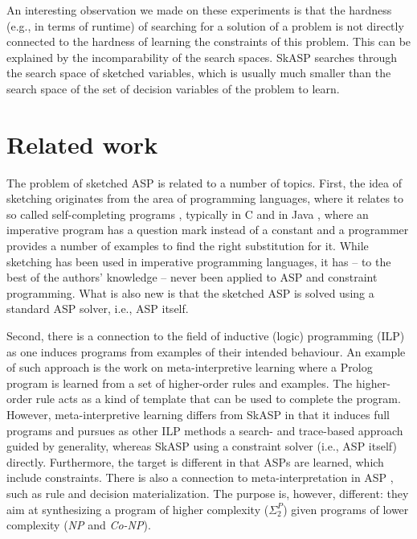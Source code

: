 An interesting observation we made on these experiments is that the 
hardness (e.g., in terms of runtime) of searching for a solution of 
a problem is not directly connected to the hardness of learning the 
constraints of this problem. This can be explained by the incomparability of the search spaces. 
SkASP searches through the search space of sketched variables, 
which is usually much smaller than  the search space of the set of decision variables 
of the problem to learn.

\section{Related work}\label{sec:related_work}
The problem of sketched ASP is related to a number of topics.
First, the idea of sketching originates from the area of programming languages, where
it relates to so called self-completing programs \cite{sketching_phd_thesis}, typically in C \cite{sketching_original} and in Java \cite{jsketch}, where an imperative program has a question mark instead of a constant and a programmer provides a number of examples to find the right substitution for it. While sketching has been used in imperative programming languages, it has -- to the best of the authors' knowledge -- never been applied to ASP and constraint programming.  What is also new is that the sketched ASP is solved using a standard ASP solver, i.e., ASP itself.

Second, there is a connection to the field of inductive (logic) programming (ILP)  \cite{ilp_book,ilp_original,gulwani2015inductive}
as one induces programs from examples of their intended behaviour.  
An example of such approach is the work on meta-interpretive learning \cite{MuggletonMLJ14,MuggletonMLJ15} where 
a Prolog program is learned from a set of higher-order rules and examples. The higher-order rule acts as a kind of template
that can be used to complete the program. 
However, meta-interpretive learning differs from SkASP in that it induces full programs 
and pursues as other ILP methods a search- and trace-based approach guided by generality, 
whereas SkASP using a constraint solver (i.e., ASP itself) directly.  Furthermore, the target is different in that ASPs are learned, which include constraints. %
There is also a connection to meta-interpretation in ASP \cite{asp_meta}, such as rule and decision materialization. The purpose is, however, different: they aim at synthesizing a program of higher complexity ($\Sigma_2^P$) given programs of lower complexity (\textit{NP} and \textit{Co-NP}).

